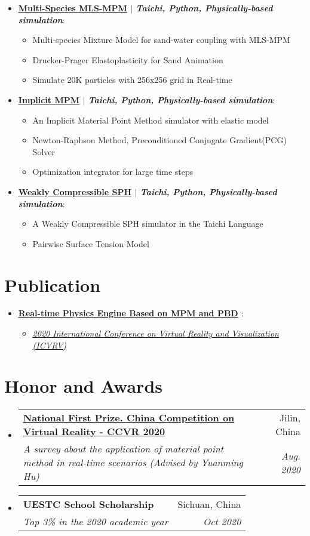 \documentclass[letterpaper,11pt]{article}
\makeatletter
\newcommand{\resumeItem}[2]{
  \item\small{
    \textbf{#1}{: #2 \vspace{-2pt}}
  }
}
\newcommand{\resumeIteml}[1]{
  \item\small{
    {#1 \vspace{-2pt}}
  }
}
\newcommand{\resumeSubheading}[4]{
  \vspace{-1pt}\item
    \begin{tabular*}{0.97\textwidth}[t]{l@{\extracolsep{\fill}}r}
      \textbf{#1} & #2 \\
      \textit{\small#3} & \textit{\small #4} \\
    \end{tabular*}\vspace{-5pt}
}
\newcommand{\resumeSubItem}[2]{\resumeItem{#1}{#2}\vspace{-4pt}}
\newcommand{\resumeSubHeadingListStart}{\begin{itemize}[leftmargin=*]}
\newcommand{\resumeSubHeadingListEnd}{\end{itemize}}
\newcommand{\resumeItemListStart}{\begin{itemize}}
\newcommand{\resumeItemListEnd}{\end{itemize}\vspace{-5pt}}
\makeatother
\begin{document}
  \resumeSubHeadingListStart
   \resumeSubItem {\href{https://github.com/g1n0st/GAMES201/tree/master/hw2}{\textbf{Multi-Species MLS-MPM}} $|$ \emph{Taichi, Python, Physically-based simulation}}{}
	 \resumeItemListStart
        \resumeIteml{ Multi-species Mixture Model for sand-water coupling with MLS-MPM }
		\resumeIteml{ Drucker-Prager Elastoplasticity for Sand Animation }
        \resumeIteml{ Simulate 20K particles with 256x256 grid in Real-time }
	 \resumeItemListEnd
  \resumeSubHeadingListEnd

   \resumeSubHeadingListStart
   \resumeSubItem {\href{https://github.com/g1n0st/GAMES201/tree/master/extra/implicitMPM}{\textbf{Implicit MPM}} $|$ \emph{Taichi, Python, Physically-based simulation}}{}
	 \resumeItemListStart
        \resumeIteml{ An Implicit Material Point Method simulator with elastic model}
        \resumeIteml{ Newton-Raphson Method, Preconditioned Conjugate Gradient(PCG) Solver }
		\resumeIteml{ Optimization integrator for large time steps }
	 \resumeItemListEnd
  \resumeSubHeadingListEnd

  \resumeSubHeadingListStart
   \resumeSubItem {\href{https://github.com/g1n0st/GAMES201/tree/master/extra/WeaklyCompressibleSPH}{\textbf{Weakly Compressible SPH}} $|$ \emph{Taichi, Python, Physically-based simulation}}{}
	 \resumeItemListStart
        \resumeIteml{ A Weakly Compressible SPH simulator in the Taichi Language }
        \resumeIteml{ Pairwise Surface Tension Model }
	 \resumeItemListEnd
  \resumeSubHeadingListEnd


\section{Publication}
    \resumeSubHeadingListStart
      \resumeSubItem
          {\href{}{\textbf{Real-time Physics Engine Based on MPM and PBD}} }{}
          \resumeItemListStart
            \resumeIteml{\href{http://www.icvrv.org/index.html}{\textit{2020 International Conference on Virtual Reality and Visualization (ICVRV)}}}
        \resumeItemListEnd
    \resumeSubHeadingListEnd


\section{Honor and Awards}
  \resumeSubHeadingListStart
    \resumeSubheading
      {\href{https://www.chinavr.info/news/show/id/3659.html}{National First Prize. China Competition on Virtual Reality -  CCVR 2020}}{Jilin, China }
      {A survey about the application of material point method in real-time scenarios (Advised by Yuanming Hu)}{Aug. 2020}
     \resumeSubheading
      {UESTC School Scholarship}{Sichuan, China }
      {Top 3\% in the 2020 academic year } {Oct 2020}
 \resumeSubHeadingListEnd
\end{document}
